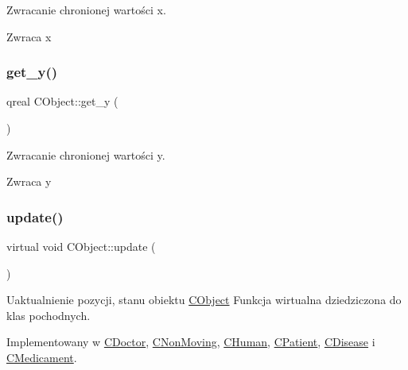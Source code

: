 Zwracanie chronionej wartości x. 

\begin{DoxyReturn}{Zwraca}
x 
\end{DoxyReturn}
\mbox{\label{class_c_object_a0d35a19c161a897458a6077cbe756d7f}} 
\subsubsection{\texorpdfstring{get\+\_\+y()}{get\_y()}}
{\footnotesize\ttfamily qreal C\+Object\+::get\+\_\+y (\begin{DoxyParamCaption}{ }\end{DoxyParamCaption})}



Zwracanie chronionej wartości y. 

\begin{DoxyReturn}{Zwraca}
y 
\end{DoxyReturn}
\mbox{\label{class_c_object_acb42ca516e836d0267ddb9a0556916a9}} 
\subsubsection{\texorpdfstring{update()}{update()}}
{\footnotesize\ttfamily virtual void C\+Object\+::update (\begin{DoxyParamCaption}{ }\end{DoxyParamCaption})\hspace{0.3cm}{\ttfamily [pure virtual]}}



Uaktualnienie pozycji, stanu obiektu \mbox{\hyperlink{class_c_object}{C\+Object}} Funkcja wirtualna dziedziczona do klas pochodnych. 



Implementowany w \mbox{\hyperlink{class_c_doctor_a9ae22158d776a4c489158b9b944fbe80}{C\+Doctor}}, \mbox{\hyperlink{class_c_non_moving_ad17a839c59eb2639623e863a3d6c8740}{C\+Non\+Moving}}, \mbox{\hyperlink{class_c_human_adb7f7d855ace82f7517bb49f465ea5d9}{C\+Human}}, \mbox{\hyperlink{class_c_patient_a40dd4c549f4b40928b95dd4d8f2ad311}{C\+Patient}}, \mbox{\hyperlink{class_c_disease_a2f8e7ad1e743ace0540a09a6f620d6d7}{C\+Disease}} i \mbox{\hyperlink{class_c_medicament_a3568bc88e5fa9db63e82fcad13ce90eb}{C\+Medicament}}.



